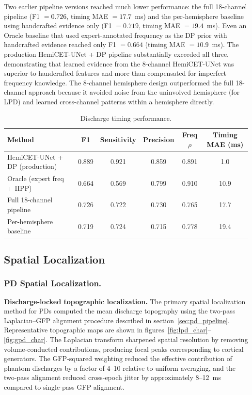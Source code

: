 \documentclass{iopjournal}
\begin{document}
Two earlier pipeline versions reached much lower performance: the full 18-channel pipeline (F1 $= 0.726$, timing MAE $= 17.7$~ms) and the per-hemisphere baseline using handcrafted evidence only (F1 $= 0.719$, timing MAE $= 19.4$~ms). Even an Oracle baseline that used expert-annotated frequency as the DP prior with handcrafted evidence reached only F1 $= 0.664$ (timing MAE $= 10.9$~ms). The production HemiCET-UNet + DP pipeline substantially exceeded all three, demonstrating that learned evidence from the 8-channel HemiCET-UNet was superior to handcrafted features and more than compensated for imperfect frequency knowledge. The 8-channel hemisphere design outperformed the full 18-channel approach because it avoided noise from the uninvolved hemisphere (for LPD) and learned cross-channel patterns within a hemisphere directly.

\begin{table}[t]
\caption{Discharge timing performance.}
\centering
\begin{tabular}{l c c c c c}
\hline
Method & F1 & Sensitivity & Precision & Freq $\rho$ & Timing MAE (ms) \\
\hline
HemiCET-UNet + DP (production) & 0.889 & 0.921 & 0.859 & 0.891 & 1.0 \\
Oracle (expert freq + HPP) & 0.664 & 0.569 & 0.799 & 0.910 & 10.9 \\
Full 18-channel pipeline & 0.726 & 0.722 & 0.730 & 0.765 & 17.7 \\
Per-hemisphere baseline & 0.719 & 0.724 & 0.715 & 0.778 & 19.4 \\
\hline
\end{tabular}
\label{tab:timing}
\end{table}

\subsection{Spatial Localization}
\label{sec:spatial}

\subsubsection{PD Spatial Localization.}

\textbf{Discharge-locked topographic localization.} The primary spatial localization method for PDs computed the mean discharge topography using the two-pass Laplacian--GFP alignment procedure described in section~\ref{sec:pd_pipeline}. Representative topographic maps are shown in figures~\ref{fig:lpd_char}--\ref{fig:gpd_char}. The Laplacian transform sharpened spatial resolution by removing volume-conducted contributions, producing focal peaks corresponding to cortical generators. The GFP-squared weighting reduced the effective contribution of phantom discharges by a factor of 4--10 relative to uniform averaging, and the two-pass alignment reduced cross-epoch jitter by approximately 8--12~ms compared to single-pass GFP alignment.
\end{document}
